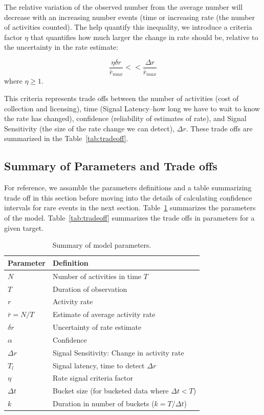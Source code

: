 \documentclass{article}
\begin{document}
The relative variation of the observed number from the average number will decrease with an increasing number events (time or increasing rate (the number of activities counted). The help quantify this inequality, we introduce a criteria factor $\eta$ that quantifies how much larger the change in rate should be, relative to the uncertainty in the rate estimate:

\begin{equation}
    \label{eq:criteriaParam}
    \frac{\eta \delta r}{\bar{r}_{max}} << \frac{\Delta r}{\bar{r}_{max}}
\end{equation}
where $\eta \ge 1$.

This criteria represents trade offs between the number of activities (cost of collection and licensing), time (Signal Latency--how long we have to wait to know the rate has changed), confidence (reliability of estimates of rate), and Signal Sensitivity (the size of the rate change we can detect), $\Delta r$. These trade offs are summarized in the Table~\ref{tab:tradeoff}.

\subsection{Summary of Parameters and Trade offs}

For reference, we assamble the parameters definitions and a table summarizing trade off in this section before moving into the details of calculating confidence intervals for rare events in the next section.  Table~\ref{tab:summary} summarizes the parameters of the model. Table~\ref{tab:tradeoff} summarizes the trade offs in parameters for a given target.

\begin{table} [!h]
    \begin{tabular}{m{4cm}| m{7cm}}
     \hline
Parameter  & Definition \\
\hline	
$N$ & Number of activities in time $T$\\
$T$ & Duration of observation\\
$r$ & Activity rate \\
$\bar{r} = N/T$ & Estimate of average activity rate \\
$\delta r$ & Uncertainty of rate estimate \\
$\alpha$ & Confidence\\
$\Delta r$ & Signal Sensitivity: Change in activity rate \\
$T_l$ & Signal latency, time to detect $\Delta r$  \\
$\eta$ & Rate signal criteria factor \\
$\Delta t$ & Bucket size (for bucketed data where $\Delta t <T$) \\
$k$ & Duration in number of  buckets ($k=T/\Delta t$) \\
\hline
\end{tabular}
\caption{Summary of model parameters.}
\label{tab:summary}
\end{table}
\end{document}
